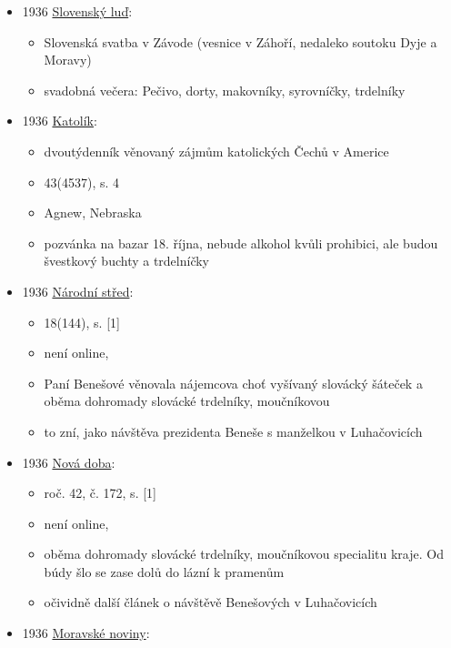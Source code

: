 \begin{itemize}
  \begin{itemize}
  \tightlist
  \item
    baumkuchen = trdelník, trdlovec
  \end{itemize}
\item
  1936
  \href{https://dikda.snk.sk/uuid/uuid:36ee29c6-cef2-457b-83fa-9fc9e4bae3c5}{Slovenský
  luď}:

  \begin{itemize}
  \tightlist
  \item
    Slovenská svatba v Závode (vesnice v Záhoří, nedaleko soutoku Dyje a
    Moravy)
  \item
    svadobná večera: Pečivo, dorty, makovníky, syrovníčky, trdelníky
  \end{itemize}
\item
  1936
  \href{https://www.digitalniknihovna.cz/nm/uuid/uuid:a08f1d57-2406-4fc7-b024-0b8a250dc278}{Katolík}:

  \begin{itemize}
  \tightlist
  \item
    dvoutýdenník věnovaný zájmům katolických Čechů v Americe
  \item
    43(4537), s. 4
  \item
    Agnew, Nebraska
  \item
    pozvánka na bazar 18. října, nebude alkohol kvůli prohibici, ale
    budou švestkový buchty a trdelníčky
  \end{itemize}
\item
  1936
  \href{https://www.digitalniknihovna.cz/cuni_fsv/uuid/uuid:c6a0bdef-e7eb-4487-96c8-29b345c550c6}{Národní
  střed}:

  \begin{itemize}
  \tightlist
  \item
    18(144), s. {[}1{]}
  \item
    není online, 
  \item
    Paní Benešové věnovala nájemcova choť vyšívaný slovácký šáteček a
    oběma dohromady slovácké trdelníky, moučníkovou
  \item
    to zní, jako návštěva prezidenta Beneše s manželkou v Luhačovicích
  \end{itemize}
\item
  1936
  \href{https://www.digitalniknihovna.cz/svkpk/uuid/uuid:853263a0-e71f-11e1-85ec-000d606f5dc6}{Nová
  doba}:

  \begin{itemize}
  \tightlist
  \item
    roč. 42, č. 172, s. {[}1{]}
  \item
    není online, 
  \item
    oběma dohromady slovácké trdelníky, moučníkovou specialitu kraje. Od
    búdy šlo se zase dolů do lázní k pramenům
  \item
    očividně další článek o návštěvě Benešových v Luhačovicích
  \end{itemize}
\item
  1936
  \href{https://www.digitalniknihovna.cz/vkol/uuid/uuid:f662a3d4-716f-4101-9b3a-8a88e6787e10}{Moravské
  noviny}:


\end{itemize}
